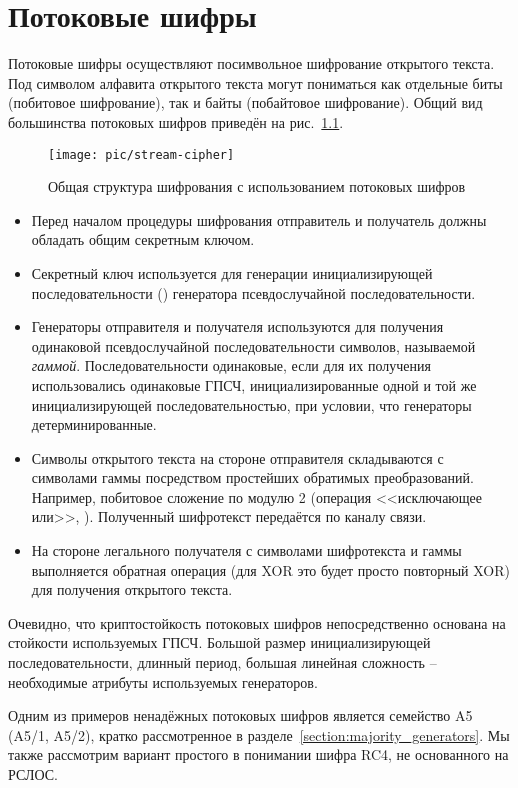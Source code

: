 \chapter{Потоковые шифры}\label{chapter-stream-ciphers}

Потоковые шифры осуществляют посимвольное шифрование открытого текста. Под символом алфавита открытого текста могут пониматься как отдельные биты (побитовое шифрование), так и байты (побайтовое шифрование). Общий вид большинства потоковых шифров приведён на рис.~\ref{fig:stream-cipher}.

\begin{figure}[hb]
	\centering
	\texttt{[image: pic/stream-cipher]}
  \caption{Общая структура шифрования с использованием потоковых шифров}
  \label{fig:stream-cipher}
\end{figure}

\begin{itemize}
	\item Перед началом процедуры шифрования отправитель и получатель должны обладать общим секретным ключом.
	\item Секретный ключ используется для генерации инициализирующей последовательности () генератора псевдослучайной последовательности.
	\item Генераторы отправителя и получателя используются для получения одинаковой псевдослучайной последовательности символов, называемой \emph{гаммой}. Последовательности одинаковые, если для их получения использовались одинаковые ГПСЧ, инициализированные одной и той же инициализирующей последовательностью, при условии, что генераторы детерминированные.
	\item Символы открытого текста на стороне отправителя складываются с символами гаммы посредством простейших обратимых преобразований. Например, побитовое сложение по модулю 2 (операция <<исключающее или>>, ). Полученный шифротекст передаётся по каналу связи.
	\item На стороне легального получателя с символами шифротекста и гаммы выполняется обратная операция (для XOR это будет просто повторный XOR) для получения открытого текста.
\end{itemize}

Очевидно, что криптостойкость потоковых шифров непосредственно основана на стойкости используемых ГПСЧ. Большой размер инициализирующей последовательности, длинный период, большая линейная сложность -- необходимые атрибуты используемых генераторов.

Одним из примеров ненадёжных потоковых шифров является семейство A5 (A5/1, A5/2), кратко рассмотренное в разделе~\ref{section:majority_generators}. Мы также рассмотрим вариант простого в понимании шифра RC4, не основанного на РСЛОС.



